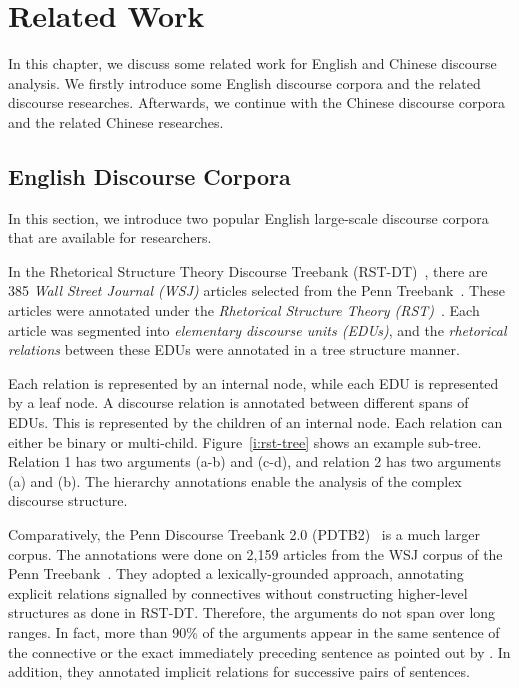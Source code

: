 %
%
%
\chapter{Related Work}
\label{c:related}

In this chapter, we discuss some related work for English and Chinese discourse
analysis. We firstly introduce some English discourse corpora and the
related discourse researches. Afterwards, we continue with the Chinese
discourse corpora and the related Chinese researches.

\section{English Discourse Corpora}

In this section, we introduce two popular English large-scale discourse
corpora that are available for researchers.

In the Rhetorical Structure Theory Discourse Treebank (RST-DT)~\citep{Carlson01building},
there are 385 \textit{Wall Street Journal (WSJ)} articles selected from
the Penn Treebank~\citep{marcus1993building}. These articles were annotated under
the \textit{Rhetorical Structure Theory (RST)}~\citep{mann-thompson88}.
Each article was segmented into \textit{elementary discourse units (EDUs)}, and the
\textit{rhetorical relations} between these EDUs were annotated in a tree structure
manner.

Each relation is represented by an internal node, while each EDU is represented
by a leaf node. A discourse relation is annotated between different spans of EDUs.
This is represented by the children of an internal node. Each relation can
either be binary or multi-child. Figure~\ref{i:rst-tree} shows an example sub-tree.
Relation 1 has two arguments (a-b) and (c-d), and relation 2 has two
arguments (a) and (b).
The hierarchy annotations enable the analysis of the complex discourse structure.



Comparatively, the Penn Discourse Treebank 2.0 (PDTB2)~\citep{Prasad08thepenn}
is a much larger corpus. The annotations were done on 2,159 articles from
the WSJ corpus of the Penn Treebank~\citep{marcus1993building}. They adopted a lexically-grounded
approach, annotating explicit relations signalled by connectives without constructing higher-level
structures as done in RST-DT. Therefore, the arguments do not span over long ranges. In fact,
more than 90\% of the arguments appear in the same sentence of the connective or the
exact immediately preceding sentence as pointed out by \cite{kong2014a}.
In addition, they annotated implicit relations for successive pairs of sentences.


